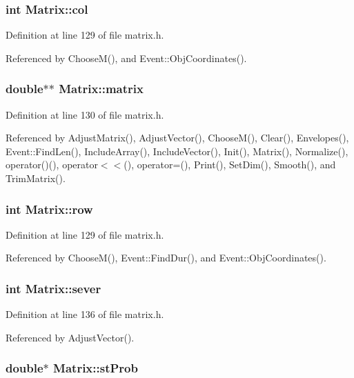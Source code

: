 \subsubsection{\setlength{\rightskip}{0pt plus 5cm}int {\bf Matrix::col}}\label{classMatrix_o0}




Definition at line 129 of file matrix.h.

Referenced by Choose\-M(), and Event::Obj\-Coordinates().
\subsubsection{\setlength{\rightskip}{0pt plus 5cm}double$\ast$$\ast$ {\bf Matrix::matrix}}\label{classMatrix_o2}




Definition at line 130 of file matrix.h.

Referenced by Adjust\-Matrix(), Adjust\-Vector(), Choose\-M(), Clear(), Envelopes(), Event::Find\-Len(), Include\-Array(), Include\-Vector(), Init(), Matrix(), Normalize(), operator()(), operator$<$$<$(), operator=(), Print(), Set\-Dim(), Smooth(), and Trim\-Matrix().
\subsubsection{\setlength{\rightskip}{0pt plus 5cm}int {\bf Matrix::row}}\label{classMatrix_o1}




Definition at line 129 of file matrix.h.

Referenced by Choose\-M(), Event::Find\-Dur(), and Event::Obj\-Coordinates().
\subsubsection{\setlength{\rightskip}{0pt plus 5cm}int {\bf Matrix::sever}\hspace{0.3cm}{\tt  [private]}}\label{classMatrix_r1}




Definition at line 136 of file matrix.h.

Referenced by Adjust\-Vector().
\subsubsection{\setlength{\rightskip}{0pt plus 5cm}double$\ast$ {\bf Matrix::st\-Prob}\hspace{0.3cm}{\tt  [private]}}\label{classMatrix_r0}




